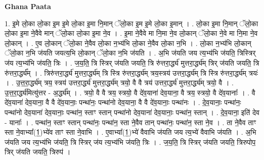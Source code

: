 \documentclass[17pt]{extarticle}
\begin{document}
\textbf{Ghana Paata } \newline

1. इ॒मे लो॒का लो॒का इ॒म इ॒मे लो॒का इ॒मा नि॒मान् ॅलो॒का इ॒म इ॒मे लो॒का इ॒मान् । . लो॒का इ॒मा नि॒मान् ॅलो॒का लो॒का इ॒मा ने॒वैवे मान् ॅलो॒का लो॒का इ॒मा ने॒व । . इ॒मा ने॒वैवे मा नि॒मा ने॒व लो॒कान् ॅलो॒का ने॒वे मा नि॒मा ने॒व लो॒कान् । . ए॒व लो॒कान् ॅलो॒का ने॒वैव लो॒का न॒भ्य॑भि लो॒का ने॒वैव लो॒का न॒भि । . लो॒का न॒भ्य॑भि लो॒कान् ॅलो॒का न॒भि ज॑यति जयत्य॒भि लो॒कान् ॅलो॒का न॒भि ज॑यति । . अ॒भि ज॑यति जय त्य॒भ्य॑भि ज॑यति॒ त्रिस्त्रिर् ज॑य त्य॒भ्य॑भि ज॑यति॒ त्रिः । . ज॒य॒ति॒ त्रि स्त्रिर् ज॑यति जयति॒ त्रि रु॑त्तरा॒र्द्ध्य॑ मुत्तरा॒र्द्ध्य॑म् त्रिर् ज॑यति जयति॒ त्रि रु॑त्तरा॒र्द्ध्य᳚म् । . त्रिरु॑त्तरा॒र्द्ध्य॑ मुत्तरा॒र्द्ध्य॑म् त्रि स्त्रि रु॑त्तरा॒र्द्ध्य॑म् त्रय॒स्त्रय॑ उत्तरा॒र्द्ध्य॑म् त्रि स्त्रि रु॑त्तरा॒र्द्ध्य॑म् त्रयः॑ । . उ॒त्त॒रा॒र्द्ध्य॑म् त्रय॒ स्त्रय॑ उत्तरा॒र्द्ध्य॑ मुत्तरा॒र्द्ध्य॑म् त्रयो॒ वै वै त्रय॑ उत्तरा॒र्द्ध्य॑ मुत्तरा॒र्द्ध्य॑म् त्रयो॒ वै । . उ॒त्त॒रा॒र्द्ध्य॑मित्यु॑त्तर - अ॒र्द्ध्य᳚म् । . त्रयो॒ वै वै त्रय॒ स्त्रयो॒ वै दे॑व॒याना॑ देव॒याना॒ वै त्रय॒ स्त्रयो॒ वै दे॑व॒यानाः᳚ । . वै दे॑व॒याना॑ देव॒याना॒ वै वै दे॑व॒यानाः॒ पन्था॑नः॒ पन्था॑नो देव॒याना॒ वै वै दे॑व॒यानाः॒ पन्था॑नः । . दे॒व॒यानाः॒ पन्था॑नः॒ पन्था॑नो देव॒याना॑ देव॒यानाः॒ पन्था॑न॒ स्ताꣳ स्तान् पन्था॑नो देव॒याना॑ देव॒यानाः॒ पन्था॑न॒ स्तान् । . दे॒व॒याना॒ इति॑ देव - यानाः᳚ । . पन्था॑न॒ स्ताꣳ स्तान् पन्था॑नः॒ पन्था॑न॒ स्ता ने॒वैव तान् पन्था॑नः॒ पन्था॑न॒ स्ता ने॒व । . ता ने॒वैव ताꣳ स्ता ने॒वाभ्या᳚(1॒)भ्ये॑व ताꣳ स्ता ने॒वाभि । . ए॒वाभ्या᳚(1॒)भ्ये॑ वैवाभि ज॑यति जय त्य॒भ्ये॑ वैवाभि ज॑यति । . अ॒भि ज॑यति जय त्य॒भ्य॑भि ज॑यति॒ त्रि स्त्रिर् ज॑य त्य॒भ्य॑भि ज॑यति॒ त्रिः । . ज॒य॒ति॒ त्रि स्त्रिर् ज॑यति जयति॒ त्रिरुपोप॒ त्रिर् ज॑यति जयति॒ त्रिरुप॑ । \newline
\end{document}
